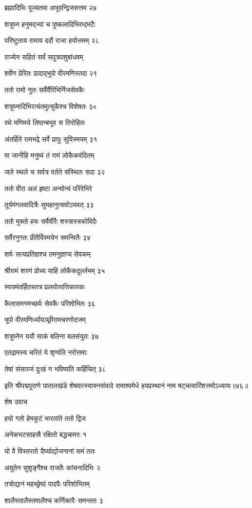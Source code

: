 ब्रह्मादिभिः पूज्यतमा अभूवन्द्विजसत्तम २७

शत्रुघ्न हनुमद्भ्यां च पुष्कलादिभिरुद्भटैः

परिष्टुताय रामाय ददौ राजा हयोत्तमम् २८

राज्येन सहितं सर्वं सपुत्रपशुबांधवम्

शर्वेण प्रेरितः प्रादाद्भूपो वीरमणिस्तदा २९

ततो रामो नुतः सर्वैर्वैरिभिर्निजसेवकैः

शत्रुघ्नादिभिरत्यंतमुत्सुकैश्च विशेषतः ३०

रथे मणिमये तिष्ठन्बभूव स तिरोहितः

अंतर्हिते रामभद्रे सर्वे प्रापुः सुविस्मयम् ३१

मा जानीहि मनुष्यं तं रामं लोकैकवंदितम्

जले स्थले च सर्वत्र वर्तते संस्थितः सदा ३२

ततो वीरा अलं हृष्टा अन्योन्यं परिरेभिरे

तूर्यमंगलवादित्रैः सुमहानुत्सवोऽभवत् ३३

ततो मुक्तो हयः सर्वैर्वीरैः शस्त्रास्त्रकोविदैः

सर्वैरनुगतः प्रीतैर्विस्मयेन समन्वितैः ३४

शर्वः सत्यप्रतिज्ञश्च तमनुज्ञाप्य सेवकम्

श्रीरामं शरणं प्रोच्य याहि लोकैकदुर्ल्लभम् ३५

स्वयमंतर्हितस्तत्र प्रलयोत्पत्तिकारकः

कैलासमगमच्छर्वः सेवकैः परिशोभितः ३६

भूपो वीरमणिर्ध्यायञ्छ्रीरामचरणोदजम्

शत्रुघ्नेन ययौ साकं बलिना बलसंयुतः ३७

एतद्रामस्य चरितं ये शृण्वंति नरोत्तमाः

तेषां संसारजं दुःखं न भविष्यति कर्हिचित् ३८

इति श्रीपद्मपुराणे पातालखंडे शेषवात्स्यायनसंवादे रामाश्वमेधे हयप्रस्थानं नाम षट्चत्वारिंशत्तमोऽध्यायः॥४६॥


शेष उवाच

हयो गतो हेमकूटं भारतांते ततो द्विज

अनेकभटसाहस्रै रक्षितो बद्धचामरः १

यो वै विस्तरतो दैर्घ्याद्योजनानां समं ततः

अयुतेन सुशृङ्गैश्च राजतैः कांचनादिभिः २

तत्रोद्यानं महच्छ्रेष्ठं पादपैः परिशोभितम्

शालैस्तालैस्तमालैश्च कर्णिकारैः समन्ततः ३

